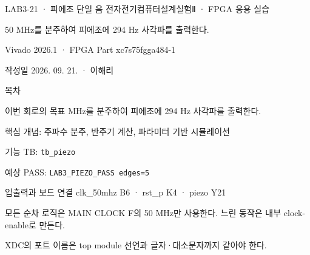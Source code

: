 

\renewcommand{\small}{\fontsize{8.7}{10.5}\selectfont}
\setlength{\leftmargini}{1.35em}

\begin{frame}{LAB3-21 · 피에조 단일 음}
\small
전자전기컴퓨터설계실험Ⅱ · FPGA 응용 실습\par\vspace{0.28cm}
50 MHz를 분주하여 피에조에 294 Hz 사각파를 출력한다.\par\vspace{0.28cm}
Vivado 2026.1 · FPGA Part xc7s75fgga484-1\par\vspace{0.28cm}
작성일 2026. 09. 21. · 이해리
\end{frame}

\begin{frame}[label=lab3-contents]{목차}
\small
{}\par\vspace{0.28cm}
\par\vspace{0.28cm}
\par\vspace{0.28cm}
\par\vspace{0.28cm}
\par\vspace{0.28cm}
\end{frame}

\begin{frame}[label=goal]{이번 회로의 목표}
\small
50 MHz를 분주하여 피에조에 294 Hz 사각파를 출력한다.\par\vspace{0.28cm}
핵심 개념: 주파수 분주, 반주기 계산, 파라미터 기반 시뮬레이션\par\vspace{0.28cm}
기능 TB: \texttt{tb\_piezo}\par\vspace{0.18cm}
예상 PASS: \texttt{LAB3\_PIEZO\_PASS edges=5}
\end{frame}

\begin{frame}{입출력과 보드 연결}
\small
clk\_50mhz B6 · rst\_p K4 · piezo Y21\par\vspace{0.32cm}
모든 순차 로직은 MAIN CLOCK F의 50 MHz만 사용한다. 느린 동작은 내부 clock-enable로 만든다.\par\vspace{0.28cm}
XDC의 포트 이름은 top module 선언과 글자·대소문자까지 같아야 한다.
\end{frame}

